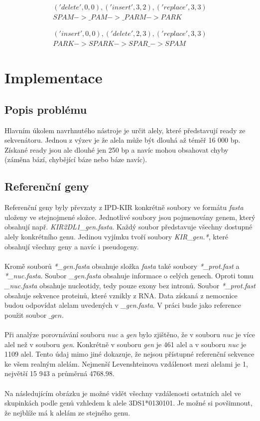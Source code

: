 \documentclass[czech,DP]{thesiskiv}
\numberwithin{equation}{section}
\begin{document}
\begin{align}
   \label{leve_1} ('delete', 0, 0), ('insert', 3, 2), ('replace', 3, 3) \\
    SPAM -> \_PAM -> \_PARM -> PARK \nonumber
\end{align}

\begin{align}
   \label{leve_2} ('insert', 0, 0), ('delete', 2, 3), ('replace', 3, 3) \\
    PARK -> SPARK -> SPAR\_ -> SPAM \nonumber
\end{align}



\chapter{Implementace}
\section{Popis problému}
Hlavním úkolem navrhnutého nástroje je určit alely, které představují ready ze sekvenátoru. Jednou z výzev je že alela může být dlouhá až téměř 16 000 bp. Získané ready jsou ale dlouhé jen 250 bp a navíc mohou obsahovat chyby (záměna bází, chybějící báze nebo báze navíc). 

\section{Referenční geny}
Referenční geny byly převzaty z IPD-KIR \cite{imgt_hla_database} konkrétně soubory ve formátu \textit{fasta} uloženy ve stejnojmené složce. Jednotlivé soubory jsou pojmenovány genem, který obsahují např. \textit{KIR2DL1\_gen.fasta}. Každý soubor představuje všechny dostupné alely konkrétního genu. Jedinou vyjímku tvoří soubory \textit{KIR\_gen.*}, které obsahují všechny geny a navíc i pseudogeny. 
\\
\\
Kromě souborů \textit{*\_gen.fasta} obsahuje složka \textit{fasta} také soubory \textit{*\_prot.fast} a \textit{*\_nuc.fasta}. Soubor \textit{\_gen.fasta} obsahuje informace o celých genech. Oproti tomu \textit{\_nuc.fasta} obsahuje nucleotidy, tedy pouze exony bez intronů. Soubor \textit{*\_prot.fast} obsahuje sekvence proteinů, které vznikly z RNA. Data získaná z nemocnice budou odpovídat alelam uvedených v \textit{\_gen.fasta}. V práci bude jako reference použit soubor $\_gen$.
\\
\\
Při analýze porovnávání souboru \textit{nuc} a \textit{gen} bylo zjištěno, že v souboru \textit{nuc} je více alel než v souboru \textit{gen}. Konkrétně v souboru \textit{gen} je 461 alel a v souboru \textit{nuc} je 1109 alel. Tento údaj  mimo jiné dokazuje, že nejsou přístupné referenční sekvence ke všem realným alelám. Nejmenší Levenshteinova vzdálenost mezi alelami je 1, největší 15 943 a průměrná 4768.98. 
\\
\\
Na následujícím obrázku je možné vidět všechny vzdálenosti ostatních alel ve skupinkách podle genů vzhledem k alele 3DS1*0130101. Je možné si povšimnout, že nejblíže má k alelám ze stejného genu.
\end{document}
